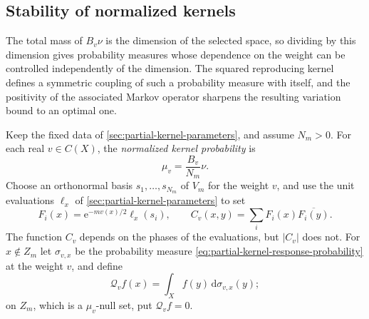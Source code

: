 \subsection{Stability of normalized kernels}
\label{sec:normalized-kernel-stability}

The total mass of $B_v\nu$ is the dimension of the selected space, so dividing by this dimension gives probability measures whose dependence on the weight can be controlled independently of the dimension. The squared reproducing kernel defines a symmetric coupling of such a probability measure with itself, and the positivity of the associated Markov operator sharpens the resulting variation bound to an optimal one.

Keep the fixed data of \cref{sec:partial-kernel-parameters}, and assume $N_m>0$. For each real $v\in C(X)$, the \emph{normalized kernel probability} is
\begin{equation}\label{eq:normalized-kernel-probability}
 \mu_v=\frac{B_v}{N_m}\nu.
\end{equation}
Choose an orthonormal basis $s_1,\ldots,s_{N_m}$ of $V_m$ for the weight $v$, and use the unit evaluations $\ell_x$ of \cref{sec:partial-kernel-parameters} to set
\[
 F_i(x)=\mathrm{e}^{-mv(x)/2}\ell_x(s_i),\qquad
 C_v(x,y)=\sum_i F_i(x)\overline{F_i(y)}.
\]
The function $C_v$ depends on the phases of the evaluations, but $|C_v|$ does not. For $x\notin Z_m$ let $\sigma_{v,x}$ be the probability measure \eqref{eq:partial-kernel-response-probability} at the weight $v$, and define
\[
 \mathcal Q_v f(x)=\int_X f(y)\,\mathrm{d}\sigma_{v,x}(y);
\]
on $Z_m$, which is a $\mu_v$-null set, put $\mathcal Q_vf=0$.

